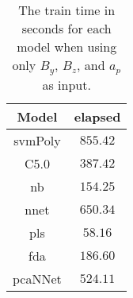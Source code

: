 \begin{table}[!ht]
	\centering
	\begin{tabular}{|c|c|}
		\hline
		Model & elapsed \\ \hline
		svmPoly & $855.42$ \\ \hline
		C5.0 & $387.42$ \\ \hline
		nb & $154.25$ \\ \hline
		nnet & $650.34$ \\ \hline
		pls & $58.16$ \\ \hline
		fda & $186.60$ \\ \hline
		pcaNNet & $524.11$ \\ \hline
	\end{tabular}
	\caption{The train time in seconds for each model when using only $B_{y}$, $B_{z}$, and $a_{p}$ as input.}
	\label{tab:time:yzap:train}
\end{table}
